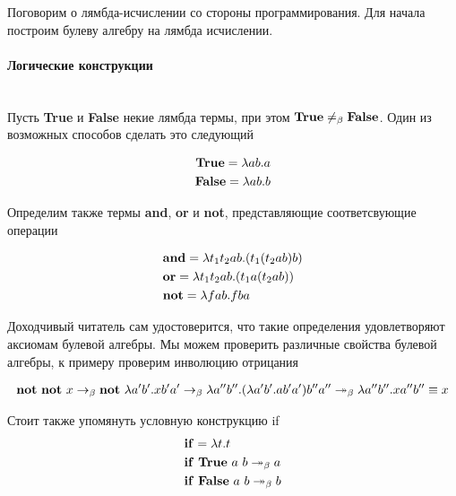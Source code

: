 \documentclass[lambda.tex]{subfiles}
\begin{document}
\newcommand{\mmterm}[1]{\text{\textbf{#1}}}
\newcommand{\mmnot}{\mmterm{not}}
\newcommand{\mmand}{\mmterm{and}}
\newcommand{\mmor}{\mmterm{or}}
\newcommand{\mmif}{\mmterm{if}}
\newcommand{\mmt}{\mmterm{True}}
\newcommand{\mmf}{\mmterm{False}}
\newcommand{\mmchurchn}[1]{\boldsymbol{\overline{#1}}}

Поговорим о лямбда-исчислении со стороны программирования. Для начала построим булеву алгебру на лямбда исчислении.

\paragraph{Логические конструкции} %
\label{par:bolean}
~\\

Пусть \textbf{True} и \textbf{False} некие лямбда термы, при этом $\mmt \neq_\beta \mmf$. Один из возможных способов сделать это следующий

\begin{align*}
\mmt = \lambda a b.a\\
\mmf = \lambda a b.b
\end{align*}

Определим также термы \textbf{and}, \textbf{or} и \textbf{not}, представляющие соответсвующие операции

\begin{align*}
&\mmand = \lambda t_1 t_2 a b . (t_1 (t_2 a b) b)\\
&\mmor = \lambda t_1 t_2 a b.(t_1 a (t_2 a b))\\
&\mmnot = \lambda f a b . f b a
\end{align*}

Доходчивый читатель сам удостоверится, что такие определения удовлетворяют аксиомам булевой алгебры.
Мы можем проверить различные свойства булевой алгебры, к примеру проверим инволюцию отрицания

\begin{align*}
	\mmnot\ \mmnot\ x \rb
	\mmnot\ \lambda a' b' . x b' a' \rb
	\lambda a'' b'' . (\lambda a' b' . a b' a') b'' a'' \rbm
	\lambda a'' b'' . x a'' b'' \equiv x
\end{align*}

Стоит также упомянуть условную конструкцию if
\begin{align*}
	&\mmif = \lambda t. t\\
	&\mmif\ \mmt\ a\ b \rbm a\\
	&\mmif\ \mmf\ a\ b \rbm b\\
\end{align*}
\end{document}
